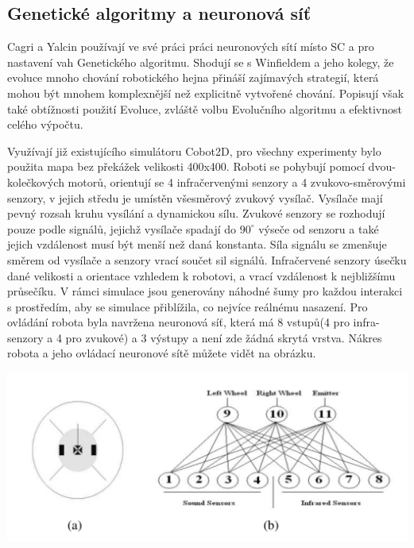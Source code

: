 \subsection{Genetické algoritmy a neuronová síť}
Cagri a Yalcin používají ve své práci \citep{yalcin2008evolving} práci neuronových sítí místo SC a pro nastavení vah Genetického algoritmu. Shodují se s Winfieldem a jeho kolegy, že evoluce mnoho chování robotického hejna přináší zajímavých strategií, která mohou být mnohem komplexnější než explicitně vytvořené chování. Popisují však také obtížnosti použití Evoluce, zvláště volbu Evolučního algoritmu a efektivnost celého výpočtu. 
\par
Využívají již existujícího simulátoru Cobot2D, pro všechny experimenty bylo použita mapa bez překážek velikosti 400x400. Roboti se pohybují pomocí dvou-kolečkových motorů, orientují se 4 infračervenými senzory a 4 zvukovo-směrovými senzory, v jejich středu je umístěn všesměrový zvukový vysílač. Vysílače mají pevný rozsah kruhu vysílání a dynamickou sílu. Zvukové senzory se rozhodují pouze podle signálů, jejichž vysílače spadají do $90^\circ$ výseče od senzoru a také jejich vzdálenost musí být menší než daná konstanta. Síla signálu se zmenšuje směrem od vysílače a senzory vrací součet sil signálů. Infračervené senzory úsečku dané velikosti a orientace vzhledem k robotovi, a vrací vzdálenost k nejbližšímu průsečíku. V rámci simulace jsou generovány náhodné šumy pro každou interakci s prostředím, aby se simulace přiblížila, co nejvíce reálnému nasazení. Pro ovládání robota byla navržena neuronová síť, která má 8 vstupů(4 pro infra-senzory a 4 pro zvukové) a 3 výstupy a není zde žádná skrytá vrstva. Nákres robota a jeho ovládací neuronové sítě můžete vidět na obrázku. \par
\begin{center} 
\includegraphics[scale=0.5]{../img/Cobot.png}
\end{center}
\par
